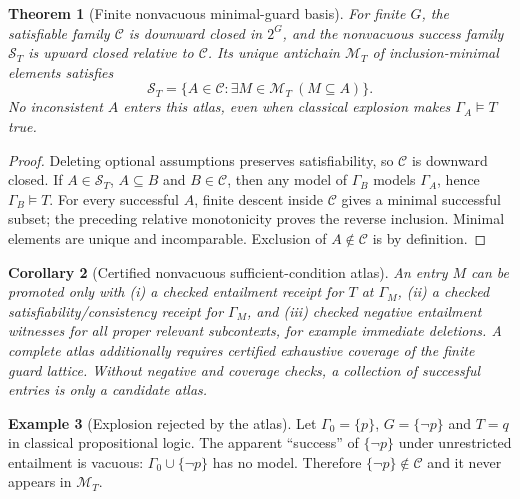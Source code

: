 \documentclass[11pt,letterpaper,oneside]{book}
\newtheorem{theorem}{Theorem}[chapter]
\newtheorem{corollary}[theorem]{Corollary}
\theoremstyle{definition}
\newtheorem{example}[theorem]{Example}
\theoremstyle{remark}
\begin{document}
\begin{theorem}[Finite nonvacuous minimal-guard basis]\label{thm:antichain}
For finite $G$, the satisfiable family $\mathcal C$ is downward closed
in $2^G$, and the nonvacuous success family $\mathcal S_T$ is
upward closed \emph{relative to} $\mathcal C$. Its unique antichain
$\mathcal M_T$ of inclusion-minimal elements satisfies
\[
\mathcal S_T=\{A\in\mathcal C:\exists M\in\mathcal M_T\ (M\subseteq A)\}.
\]
No inconsistent $A$ enters this atlas, even when classical explosion
makes $\Gamma_A\models T$ true.
\end{theorem}
\begin{proof}
Deleting optional assumptions preserves satisfiability, so
$\mathcal C$ is downward closed. If $A\in\mathcal S_T$,
$A\subseteq B$ and $B\in\mathcal C$, then any model of $\Gamma_B$
models $\Gamma_A$, hence $\Gamma_B\models T$. For every successful
$A$, finite descent inside $\mathcal C$ gives a minimal successful
subset; the preceding relative monotonicity proves the reverse
inclusion. Minimal elements are unique and incomparable. Exclusion
of $A\notin\mathcal C$ is by definition.
\end{proof}
\begin{corollary}[Certified nonvacuous sufficient-condition atlas]
An entry $M$ can be promoted only with (i) a checked entailment receipt
for $T$ at $\Gamma_M$, (ii) a checked satisfiability/consistency receipt
for $\Gamma_M$, and (iii) checked negative entailment witnesses for all
proper relevant subcontexts, for example immediate deletions. A
\emph{complete} atlas additionally requires certified exhaustive
coverage of the finite guard lattice. Without negative and coverage
checks, a collection of successful entries is only a candidate atlas.
\end{corollary}

\begin{example}[Explosion rejected by the atlas]
Let $\Gamma_0=\{p\}$, $G=\{\neg p\}$ and $T=q$ in classical
propositional logic. The apparent ``success'' of $\{\neg p\}$
under unrestricted entailment is vacuous: $\Gamma_0\cup\{\neg p\}$
has no model. Therefore $\{\neg p\}\notin\mathcal C$ and it never
appears in $\mathcal M_T$.
\end{example}
\end{document}
